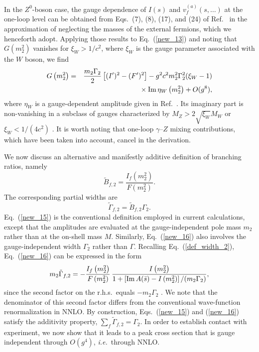 \documentclass[a4paper,12pt]{article}
\begin{document}
In the $Z^0$-boson case, the gauge dependence of $I(s)$ and
$v^{(a)}_f(s,\dots)$ at the one-loop level can be obtained from
Eqs.~(7), (8), (17), and (24) of Ref.~\cite{deg} in the approximation of
neglecting the masses of the external fermions, which we henceforth adopt.
Applying those results to Eq.~(\ref{new_13}) and noting that
$G\left(m^2_2\right)$ vanishes for $\xi_W>1/c^2$, where $\xi_W$ is the gauge
parameter associated with the $W$ boson, we find
\begin{eqnarray}
G\left(m^2_2\right)
&=&\frac{m_2\Gamma_2}{2}\left[(I^\prime)^2-(F^\prime)^2\right]
-g^2c^2m^2_2\Gamma^2_2(\xi_W-1)
\nonumber\\
&&{}\times{\rm Im}\,\eta_W\left(m^2_2\right)+O(g^8),
\label{new_14}
\end{eqnarray}
where $\eta_W$ is a gauge-dependent amplitude given in Ref.~\cite{deg}.
Its imaginary part is non-vanishing in a subclass of gauges characterized by
$M_Z>2\sqrt{\xi_W}M_W$ or $\xi_W<1/(4c^2)$ \cite{si_1,deg}.
It is worth noting that one-loop $\gamma$--$Z$ mixing contributions, which
have been taken into account, cancel in the derivation.

We now discuss an alternative and manifestly additive definition of 
branching ratios, namely
\begin{equation}
\label{new_15}
\tilde B_{f,2}=\frac{I_f\left(m^2_2\right)}{F\left(m^2_2\right)}.
\end{equation}
The corresponding partial widths are
\begin{equation}
\label{new_16}
\tilde\Gamma_{f,2}=\tilde B_{f,2}\Gamma_2. 
\end{equation}
Eq.~(\ref{new_15}) is the conventional definition employed in current
calculations, except that the amplitudes are evaluated at the
gauge-independent pole mass $m_2$ rather than at the on-shell mass $M$.
Similarly, Eq.~(\ref{new_16}) also involves the gauge-independent width
$\Gamma_2$ rather than $\Gamma$.
Recalling Eq.~(\ref{def_width_2}), Eq.~(\ref{new_16}) can be expressed in the
form
\begin{eqnarray}
\label{new_18}
m_2\tilde\Gamma_{f,2}=-\frac{I_f\left(m^2_2\right)}{F\left(m^2_2\right)}\,
\frac{I\left(m^2_2\right)}
{1+\left[{\rm Im}\,A(\bar s)-I\left(m^2_2\right)\right]/(m_2\Gamma_2)},
\end{eqnarray}
since the second factor on the r.h.s.\ equals $-m_2\Gamma_2$ \cite{pal}.
We note that the denominator of this second factor differs from the
conventional wave-function renormalization in NNLO. 
By construction, Eqs.~(\ref{new_15}) and (\ref{new_16}) satisfy the additivity
property, $\sum_f\tilde\Gamma_{f,2}=\Gamma_2$. 
In order to establish contact with experiment, 
we now show that it leads to a peak cross section that is gauge independent
through $O(g^4)$, {\it i.e.}\ through NNLO.
\end{document}
